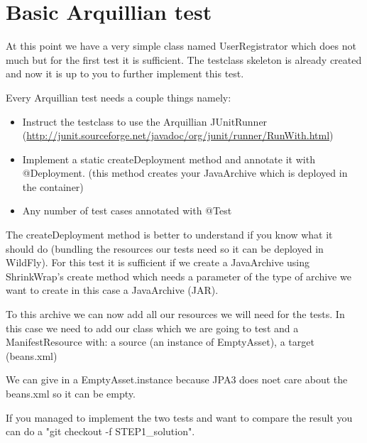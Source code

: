 \documentclass[paper=a4, fontsize=11pt]{scrartcl}
\begin{document}
\section{Basic Arquillian test}
At this point we have a very simple class named UserRegistrator which does not
much but for the first test it is sufficient. The testclass skeleton is already
created and now it is up to you to further implement this test.
\par
Every Arquillian test needs a couple things namely:
\begin{itemize}
	\item Instruct the testclass to use the Arquillian JUnitRunner
		(\url{http://junit.sourceforge.net/javadoc/org/junit/runner/RunWith.html})
	\item Implement a static createDeployment method and annotate it with
		@Deployment. (this method creates your JavaArchive which is deployed in the
		container)
	\item Any number of test cases annotated with @Test
\end{itemize}

The createDeployment method is better to understand if you know what it should do
(bundling the resources our tests need so it can be deployed in WildFly).
For this test it is sufficient if we create a JavaArchive using ShrinkWrap's create
method which needs a parameter of the type of archive we want to create in this case
a JavaArchive (JAR).
\par
To this archive we can now add all our resources we will need for the tests. In
this case we need to add our class which we are going to test and a
ManifestResource with: a source (an instance of EmptyAsset), a target (beans.xml)
\par
We can give in a EmptyAsset.instance because JPA3 does noet care about the beans.xml
so it can be empty.
\par
If you managed to implement the two tests and want to compare the result you can do
a "git checkout -f STEP1\_solution".
\end{document}
